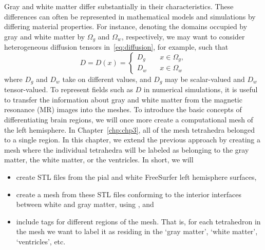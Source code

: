 Gray and white matter differ substantially in their
characteristics. These differences can often be represented in
mathematical models and simulations by differing material
properties. For instance, denoting the domains occupied by gray and
white matter by $\Omega_g$ and $\Omega_w$, respectively, we may want to
consider heterogeneous diffusion tensors in~\eqref{eq:diffusion}, for
example, such that
\begin{equation}
  \label{eq:K}
  D = D(x) = \left \{
    \begin{matrix}
      D_g & \quad x \in \Omega_g, \\
      D_w & \quad x \in \Omega_w 
    \end{matrix}
    \right .
\end{equation}
where $D_g$ and $D_w$ take on different values, and $D_g$ may be
scalar-valued and $D_w$ tensor-valued. To represent fields such as $D$
in numerical simulations, it is useful to transfer the information
about gray and white matter from the magnetic resonance (MR) images
into the meshes. To introduce the basic concepts of differentiating
brain regions, we will once more create a computational mesh of the left
hemisphere. In Chapter~\ref{chp:chp3}, all of the mesh tetrahedra belonged 
to a single region. In this chapter, we extend the previous approach 
by creating a mesh where the individual tetrahedra will be labeled as 
belonging to the gray matter, the white matter, or the ventricles. In short, 
we will
\begin{itemize}
\item
  create STL files from the pial and white FreeSurfer left hemisphere
  surfaces, 
\item
  create a mesh from these STL files conforming to the interior interfaces
  between white and gray matter, using \svmtk{}, and
\item
  include tags for different regions of the mesh. That is, for each 
  tetrahedron in the mesh we want to label it as residing in the 
  `gray matter', `white matter', `ventricles', etc.    
\end{itemize}

